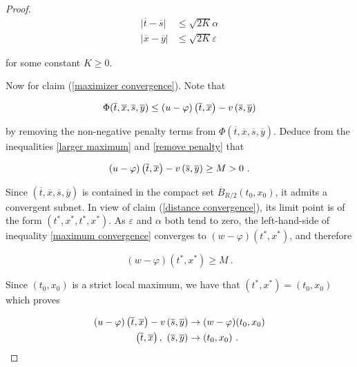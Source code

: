 \begin{lemma}
\begin{proof}
	 		\begin{align*}
	 			\lvert \overline{t} - \overline{s} \rvert &\leq \sqrt{2 K} \alpha \\
	 			\lvert \overline{x} - \overline{y} \rvert &\leq \sqrt{2 K} \varepsilon
	 		\end{align*}
	 		
	 		for some constant $ K \geq 0 $.
	 		
	 		Now for claim (\ref{maximizer convergence}). Note that
	 		
	 		\begin{equation}
	 		\label{remove penalty}
	 			\Phi(\overline{t}, \overline{x}, \overline{s}, \overline{y}) \leq
	 			(u - \varphi)\left(\overline{t}, \overline{x}\right) - v\left(\overline{s}, \overline{y}\right) 
	 		\end{equation}
	 		
	 		by removing the non-negative penalty terms from $ \Phi(\overline{t}, \overline{x}, \overline{s}, \overline{y}) $. Deduce from the inequalities \eqref{larger maximum} and \eqref{remove penalty} that
	 		
	 		\begin{equation}
	 			\label{maximum convergence}
	 			(u - \varphi)\left(\overline{t}, \overline{x}\right) - v\left(\overline{s}, \overline{y}\right) \geq M > 0 \ .
	 		\end{equation}
	 		
	 		Since $ (\overline{t}, \overline{x}, \overline{s}, \overline{y}) $ is contained in the compact set $ \overline{B}_{R /2}(t_0, x_0) $, it admits a convergent subnet. In view of claim (\ref{distance convergence}), its limit point is of the form $ (t^{*}, x^{*}, t^{*}, x^{*})  $. As $ \varepsilon $ and  $ \alpha $ both tend to zero, the left-hand-side of inequality \eqref{maximum convergence} converges to $ (w - \varphi)(t^{*}, x^{*}) $, and therefore
	 		
	 		\begin{equation*}
	 			(w - \varphi)(t^{*}, x^{*}) \geq M \ .
	 		\end{equation*}
	 		
	 		Since $ (t_0, x_0) $ is a strict local maximum, we have that $ (t^{*}, x^{*})  = (t_0, x_0) $ which proves
	 		
	 		\begin{align*}
	 			(u - \varphi)\left(\overline{t}, \overline{x}\right) - v\left(\overline{s}, \overline{y}\right) &\to (w - \varphi)(t_0, x_0) \\
	 			\left(\overline{t}, \overline{x}\right), \ \left(\overline{s}, \overline{y}\right) &\to (t_0, x_0) \ .
	 		\end{align*}
	 		

\end{proof}
\end{lemma}
